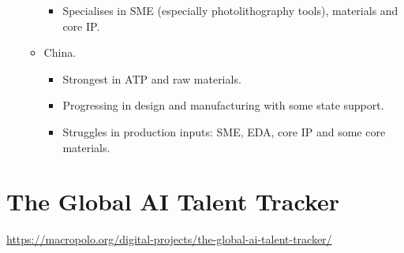 \begin{itemize}
\begin{itemize}
        \begin{itemize}
            \item Specialises in SME (especially photolithography tools), materials and core IP.
        \end{itemize}
        \item China.
        \begin{itemize}
            \item Strongest in ATP and raw materials.
            \item Progressing in design and manufacturing with some state support.
            \item Struggles in production inputs: SME, EDA, core IP and some core materials.
        \end{itemize}
    \end{itemize}
\end{itemize}


\section{The Global AI Talent Tracker}

\url{https://macropolo.org/digital-projects/the-global-ai-talent-tracker/}

